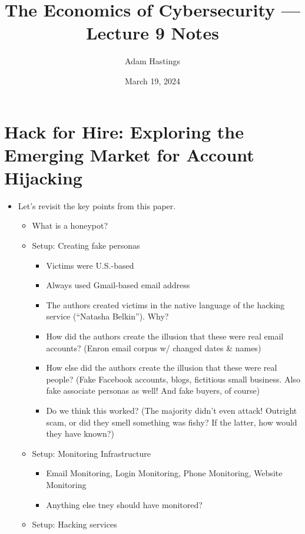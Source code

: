 \documentclass[11pt]{article}
\title{The Economics of Cybersecurity --- Lecture 9 Notes}
\date{March 19, 2024}
\author{Adam Hastings}
\begin{document}
\maketitle



\section{Hack for Hire: Exploring the Emerging Market for Account Hijacking}


\begin{itemize}
    \item Let's revisit the key points from this paper. 
    \begin{itemize}
        \item What is a honeypot?
        \item Setup: Creating fake personas
        \begin{itemize}
            \item Victims were U.S.-based
            \item Always used Gmail-based email address 
            \item The authors created victims in the native language of the hacking service (``Natasha Belkin''). Why?
            \item How did the authors create the illusion that these were real email accounts? (Enron email corpus w/ changed dates \& names)
            \item How else did the authors create the illusion that these were real people? (Fake Facebook accounts, blogs, fictitious small business. Also fake associate personas as well! And fake buyers, of course)
            \item Do we think this worked? (The majority didn't even attack! Outright scam, or did they smell something was fishy? If the latter, how would they have known?)
        \end{itemize}
        \item Setup: Monitoring Infrastructure
        \begin{itemize}
            \item Email Monitoring, Login Monitoring, Phone Monitoring, Website Monitoring
            \item Anything else tney should have monitored?
        \end{itemize}
        \item Setup: Hacking services
        \begin{itemize}

\end{itemize}
\end{itemize}
\end{itemize}
\end{document}
